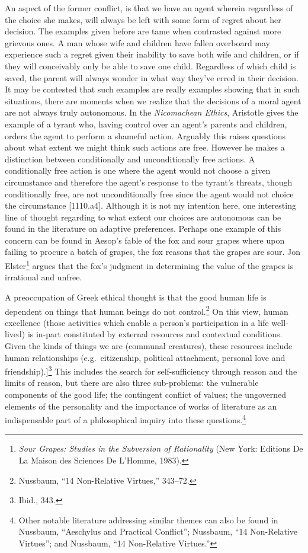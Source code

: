 \documentclass[phdthesis,12pt,final,a4paper]{wuthesis}
\theoremstyle{definition}
\theoremstyle{definition}
\theoremstyle{definition}
\theoremstyle{definition}
\theoremstyle{remark}
\begin{document}
An aspect of the former conflict, is that we have an agent wherein regardless of the choice she makes, will always be left with some form of regret about her decision. The examples given before are tame when contrasted against more grievous ones. A man whose wife and children have fallen overboard may experience such a regret given their inability to save both wife and children, or if they will conceivably only be able to save one child. Regardless of which child is saved, the parent will always wonder in what way they've erred in their decision. It may be contested that such examples are really examples showing that in such situations, there are moments when we realize that the decisions of a moral agent are not always truly autonomous. In the \emph{Nicomachean Ethics}, Aristotle gives the example of a tyrant who, having control over an agent's parents and children, orders the agent to perform a shameful action. Arguably this raises questions about what extent we might think such actions are free. However he makes a distinction between conditionally and unconditionally free actions. A conditionally free action is one where the agent would not choose a given circumstance and therefore the agent's response to the tyrant's threats, though conditionally free, are not unconditionally free since the agent would not choice the circumstance {[}1110.a4{]}. Although it is not my intention here, one interesting line of thought regarding to what extent our choices are autonomous can be found in the literature on adaptive preferences. Perhaps one example of this concern can be found in Aesop's fable of the fox and sour grapes where upon failing to procure a batch of grapes, the fox reasons that the grapes are sour. Jon Elster\footnote{\emph{Sour {Grapes}: {Studies} in the {Subversion} of {Rationality}} (New York: Editions De La Maison des Sciences De L'Homme, 1983).} argues that the fox's judgment in determining the value of the grapes is irrational and unfree.

A preoccupation of Greek ethical thought is that the good human life is dependent on things that human beings do not control.\footnote{Nussbaum, {``14 {Non-Relative Virtues},''} 343--72.} On this view, human excellence (those activities which enable a person's participation in a life well-lived) is in-part constituted by external resources and contextual conditions. Given the kinds of things we are (communal creatures), these resources include human relationships (e.g.~citizenship, political attachment, personal love and friendship).{]}\footnote{Ibid., 343.} This includes the search for self-sufficiency through reason and the limits of reason, but there are also three sub-problems: the vulnerable components of the good life; the contingent conflict of values; the ungoverned elements of the personality and the importance of works of literature as an indispensable part of a philosophical inquiry into these questions.\footnote{Other notable literature addressing similar themes can also be found in Nussbaum, {``Aeschylus and Practical Conflict''}; Nussbaum, {``14 {Non-Relative Virtues}''}; and Nussbaum, {``14 {Non-Relative Virtues}.''}}
\end{document}
